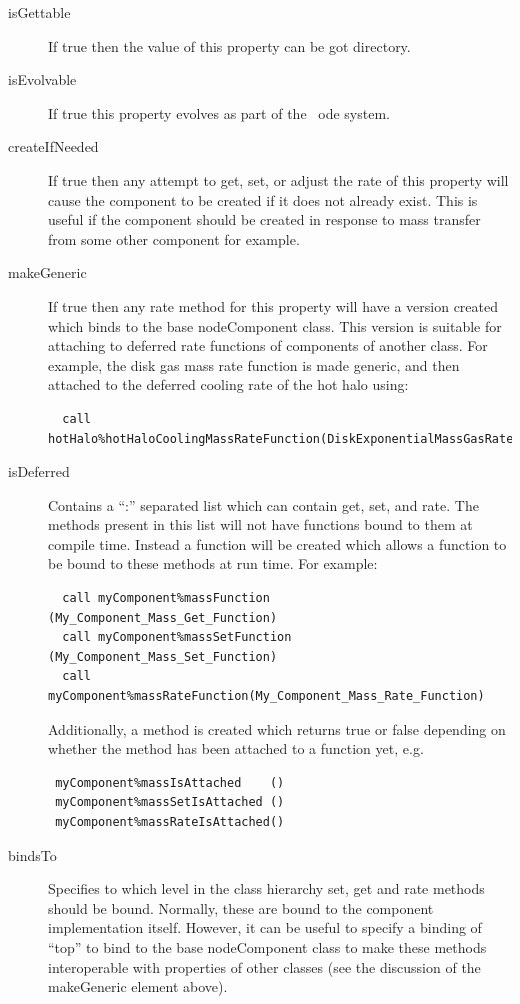 \begin{description}
\begin{description}
\begin{description}
\item [{\normalfont \ttfamily isGettable}] If {\normalfont \ttfamily true} then the value of this property can be got directory.
\item [{\normalfont \ttfamily isEvolvable}] If {\normalfont \ttfamily true} this property evolves as part of the \glc\ \gls{ode} system.
\item [{\normalfont \ttfamily createIfNeeded}] If {\normalfont \ttfamily true} then any attempt to get, set, or adjust the rate of this property will cause the component to be created if it does not already exist. This is useful if the component should be created in response to mass transfer from some other component for example.
\item [{\normalfont \ttfamily makeGeneric}] If {\normalfont \ttfamily true} then any {\normalfont \ttfamily rate} method for this property will have a version created which binds to the base {\normalfont \ttfamily nodeComponent} class. This version is suitable for attaching to deferred rate functions of components of another class. For example, the disk gas mass rate function is made generic, and then attached to the deferred cooling rate of the hot halo using:
\begin{verbatim}
  call hotHalo%hotHaloCoolingMassRateFunction(DiskExponentialMassGasRateGeneric)
\end{verbatim}
\item [{\normalfont \ttfamily isDeferred}] Contains a ``{\normalfont \ttfamily :}'' separated list which can contain {\normalfont \ttfamily get}, {\normalfont \ttfamily set}, and {\normalfont \ttfamily rate}. The methods present in this list will not have functions bound to them at compile time. Instead a function will be created which allows a function to be bound to these methods at run time. For example:
\begin{verbatim}
  call myComponent%massFunction    (My_Component_Mass_Get_Function)
  call myComponent%massSetFunction (My_Component_Mass_Set_Function)
  call myComponent%massRateFunction(My_Component_Mass_Rate_Function)
\end{verbatim}
Additionally, a method is created which returns true or false depending on whether the method has been attached to a function yet, e.g.
\begin{verbatim}
 myComponent%massIsAttached    ()
 myComponent%massSetIsAttached ()
 myComponent%massRateIsAttached()
\end{verbatim}
\item [{\normalfont \ttfamily bindsTo}] Specifies to which level in the class hierarchy set, get and rate methods should be bound. Normally, these are bound to the component implementation itself. However, it can be useful to specify a binding of ``{\normalfont \ttfamily top}'' to bind to the base {\normalfont \ttfamily nodeComponent} class to make these methods interoperable with properties of other classes (see the discussion of the {\normalfont \ttfamily makeGeneric} element above).

\end{description}
\end{description}
\end{description}
